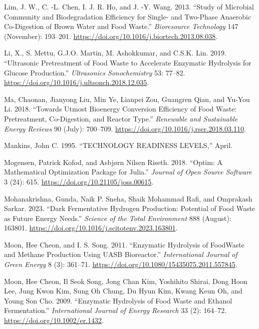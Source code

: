\documentclass[11pt]{report}
\begin{document}
\begin{hangparas}{1.5em}{1}
\hypertarget{citeproc_bib_item_40}{Lim, J. W., C. -L. Chen, I. J. R. Ho, and J. -Y. Wang. 2013. “Study of Microbial Community and Biodegradation Efficiency for Single- and Two-Phase Anaerobic Co-Digestion of Brown Water and Food Waste.” \textit{Bioresource Technology} 147 (November): 193–201. \url{https://doi.org/10.1016/j.biortech.2013.08.038}.}

\hypertarget{citeproc_bib_item_41}{Li, X., S. Mettu, G.J.O. Martin, M. Ashokkumar, and C.S.K. Lin. 2019. “Ultrasonic Pretreatment of Food Waste to Accelerate Enzymatic Hydrolysis for Glucose Production.” \textit{Ultrasonics Sonochemistry} 53: 77–82. \url{https://doi.org/10.1016/j.ultsonch.2018.12.035}.}

\hypertarget{citeproc_bib_item_42}{Ma, Chaonan, Jianyong Liu, Min Ye, Lianpei Zou, Guangren Qian, and Yu-You Li. 2018. “Towards Utmost Bioenergy Conversion Efficiency of Food Waste: Pretreatment, Co-Digestion, and Reactor Type.” \textit{Renewable and Sustainable Energy Reviews} 90 (July): 700–709. \url{https://doi.org/10.1016/j.rser.2018.03.110}.}

\hypertarget{citeproc_bib_item_43}{Mankins, John C. 1995. “TECHNOLOGY READINESS LEVELS,” April.}

\hypertarget{citeproc_bib_item_44}{Mogensen, Patrick Kofod, and Asbjørn Nilsen Riseth. 2018. “Optim: A Mathematical Optimization Package for Julia.” \textit{Journal of Open Source Software} 3 (24): 615. \url{https://doi.org/10.21105/joss.00615}.}

\hypertarget{citeproc_bib_item_45}{Mohanakrishna, Gunda, Naik P. Sneha, Shaik Mohammad Rafi, and Omprakash Sarkar. 2023. “Dark Fermentative Hydrogen Production: Potential of Food Waste as Future Energy Needs.” \textit{Science of the Total Environment} 888 (August): 163801. \url{https://doi.org/10.1016/j.scitotenv.2023.163801}.}

\hypertarget{citeproc_bib_item_46}{Moon, Hee Cheon, and I. S. Song. 2011. “Enzymatic Hydrolysis of FoodWaste and Methane Production Using UASB Bioreactor.” \textit{International Journal of Green Energy} 8 (3): 361–71. \url{https://doi.org/10.1080/15435075.2011.557845}.}

\hypertarget{citeproc_bib_item_47}{Moon, Hee Cheon, Il Seok Song, Jong Chan Kim, Yoshihito Shirai, Dong Hoon Lee, Jung Kwon Kim, Sung Oh Chung, Du Hyun Kim, Kwang Keun Oh, and Young Son Cho. 2009. “Enzymatic Hydrolysis of Food Waste and Ethanol Fermentation.” \textit{International Journal of Energy Research} 33 (2): 164–72. \url{https://doi.org/10.1002/er.1432}.}


\end{hangparas}
\end{document}
